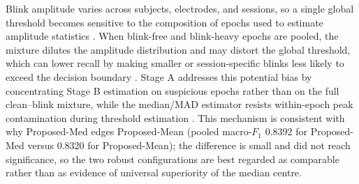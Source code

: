 Blink amplitude varies across subjects, electrodes, and sessions, so a single global threshold becomes sensitive to the composition of epochs used to estimate amplitude statistics \citep{croft2000removal,guttmann2019new}. When blink-free and blink-heavy epochs are pooled, the mixture dilutes the amplitude distribution and may distort the global threshold, which can lower recall by making smaller or session-specific blinks less likely to exceed the decision boundary \citep{klein2013reliable,guttmann2019new}. Stage A addresses this potential bias by concentrating Stage B estimation on suspicious epochs rather than on the full clean--blink mixture, while the median/MAD estimator resists within-epoch peak contamination during threshold estimation \citep{klein2013reliable}. This mechanism is consistent with why Proposed-Med edges Proposed-Mean (pooled macro-$F_1$ 0.8392 for Proposed-Med versus 0.8320 for Proposed-Mean); the difference is small and did not reach significance, so the two robust configurations are best regarded as comparable rather than as evidence of universal superiority of the median centre.

